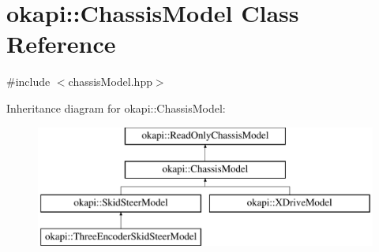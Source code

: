 \hypertarget{classokapi_1_1ChassisModel}{}\section{okapi\+::Chassis\+Model Class Reference}
\label{classokapi_1_1ChassisModel}


{\ttfamily \#include $<$chassis\+Model.\+hpp$>$}

Inheritance diagram for okapi\+::Chassis\+Model\+:\begin{figure}[H]
\begin{center}
\leavevmode
\includegraphics[height=4.000000cm]{classokapi_1_1ChassisModel}
\end{center}
\end{figure}
